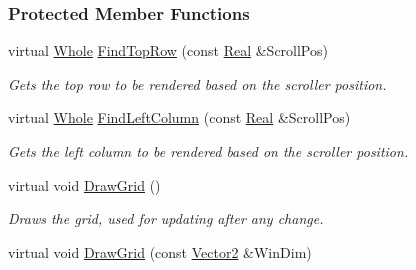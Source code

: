 \subsubsection*{Protected Member Functions}
\begin{DoxyCompactItemize}
\item 
\hypertarget{classphys_1_1UI_1_1ScrolledCellGrid_a39fd3d566131310f4a2e5713216e7ef2}{
virtual \hyperlink{namespacephys_a460f6bc24c8dd347b05e0366ae34f34a}{Whole} \hyperlink{classphys_1_1UI_1_1ScrolledCellGrid_a39fd3d566131310f4a2e5713216e7ef2}{FindTopRow} (const \hyperlink{namespacephys_af7eb897198d265b8e868f45240230d5f}{Real} \&ScrollPos)}
\label{classphys_1_1UI_1_1ScrolledCellGrid_a39fd3d566131310f4a2e5713216e7ef2}

\begin{DoxyCompactList}\small\item\em Gets the top row to be rendered based on the scroller position. \item\end{DoxyCompactList}\item 
\hypertarget{classphys_1_1UI_1_1ScrolledCellGrid_abe9fe1c56866ecc796f5b2ea8f72b853}{
virtual \hyperlink{namespacephys_a460f6bc24c8dd347b05e0366ae34f34a}{Whole} \hyperlink{classphys_1_1UI_1_1ScrolledCellGrid_abe9fe1c56866ecc796f5b2ea8f72b853}{FindLeftColumn} (const \hyperlink{namespacephys_af7eb897198d265b8e868f45240230d5f}{Real} \&ScrollPos)}
\label{classphys_1_1UI_1_1ScrolledCellGrid_abe9fe1c56866ecc796f5b2ea8f72b853}

\begin{DoxyCompactList}\small\item\em Gets the left column to be rendered based on the scroller position. \item\end{DoxyCompactList}\item 
\hypertarget{classphys_1_1UI_1_1ScrolledCellGrid_aab9b6520eefbc712c9577ae0db121f13}{
virtual void \hyperlink{classphys_1_1UI_1_1ScrolledCellGrid_aab9b6520eefbc712c9577ae0db121f13}{DrawGrid} ()}
\label{classphys_1_1UI_1_1ScrolledCellGrid_aab9b6520eefbc712c9577ae0db121f13}

\begin{DoxyCompactList}\small\item\em Draws the grid, used for updating after any change. \item\end{DoxyCompactList}\item 
\hypertarget{classphys_1_1UI_1_1ScrolledCellGrid_a2931912dae2aabe0dcfd3a30f9ad8634}{
virtual void \hyperlink{classphys_1_1UI_1_1ScrolledCellGrid_a2931912dae2aabe0dcfd3a30f9ad8634}{DrawGrid} (const \hyperlink{classphys_1_1Vector2}{Vector2} \&WinDim)}
\label{classphys_1_1UI_1_1ScrolledCellGrid_a2931912dae2aabe0dcfd3a30f9ad8634}


\end{DoxyCompactItemize}
